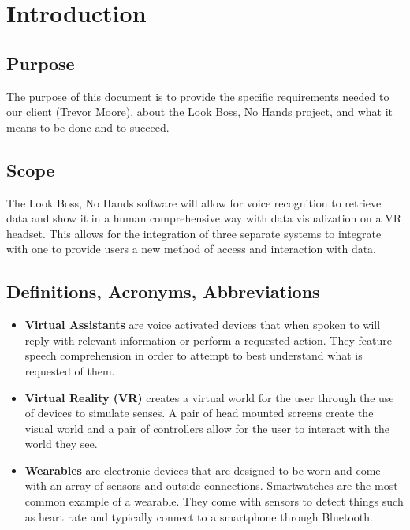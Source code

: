 \documentclass[onecolumn, draftclsnofoot,10pt, compsoc]{IEEEtran}
\begin{document}
\begin{titlepage}
\begin{singlespace}
\begin{abstract}
        \end{abstract}
    \end{singlespace}
\end{titlepage}
\newpage
{}
\tableofcontents
\clearpage


\section{Introduction}
    \subsection{Purpose}
        The purpose of this document is to provide the specific requirements needed to our client (Trevor Moore), about the Look Boss, No Hands project, and what it means to be done and to succeed.

    \subsection{Scope}
        The Look Boss, No Hands software will allow for voice recognition to retrieve data and show it in a human comprehensive way with data visualization on a VR headset. This allows for the integration of three separate systems to integrate with one to provide users a new method of access and interaction with data.

    \subsection{Definitions, Acronyms, Abbreviations}

        \begin{itemize}
            \item \textbf{Virtual Assistants} are voice activated devices that when spoken to will reply with relevant information or perform a requested action. They feature speech comprehension in order to attempt to best understand what is requested of them.\cite{def_ai}
            \item \textbf{Virtual Reality (VR)} creates a virtual world for the user through the use of devices to simulate senses. A pair of head mounted screens create the visual world and a pair of controllers allow for the user to interact with the world they see.\cite{def_vr}
            \item \textbf{Wearables} are electronic devices that are designed to be worn and come with an array of sensors and outside connections. Smartwatches are the most common example of a wearable. They come with sensors to detect things such as heart rate and typically connect to a smartphone through Bluetooth.\cite{def_wear}
        \end{itemize}
\end{document}
